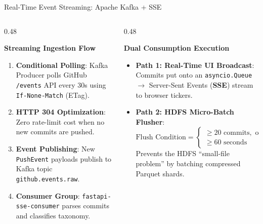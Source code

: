 \documentclass[aspectratio=169, 10pt]{beamer}
\begin{document}
\begin{frame}{Real-Time Event Streaming: Apache Kafka + SSE}
  \begin{columns}[T]
    \begin{column}{0.48\textwidth}
      \begin{block}{\textbf{Streaming Ingestion Flow}}
        \begin{enumerate}
          \item \textbf{Conditional Polling}: Kafka Producer polls GitHub \texttt{/events} API every 30s using \texttt{If-None-Match} (ETag).
          \item \textbf{HTTP 304 Optimization}: Zero rate-limit cost when no new commits are pushed.
          \item \textbf{Event Publishing}: New \texttt{PushEvent} payloads publish to Kafka topic \texttt{github.events.raw}.
          \item \textbf{Consumer Group}: \texttt{fastapi-sse-consumer} parses commits and classifies taxonomy.
        \end{enumerate}
      \end{block}
    \end{column}
    
    \begin{column}{0.48\textwidth}
      \begin{block}{\textbf{Dual Consumption Execution}}
        \begin{itemize}
          \item \textbf{Path 1: Real-Time UI Broadcast}: Commits put onto an \texttt{asyncio.Queue} $\to$ Server-Sent Events (\textbf{SSE}) stream to browser tickers.
          \item \textbf{Path 2: HDFS Micro-Batch Flusher}:
            \begin{equation*}
              \text{Flush Condition} = \begin{cases}
                \ge 20 \text{ commits}, \text{ or} \\
                \ge 60 \text{ seconds}
              \end{cases}
            \end{equation*}
            Prevents the HDFS ``small-file problem'' by batching compressed Parquet shards.
        \end{itemize}
      \end{block}
    \end{column}
  \end{columns}
\end{frame}
\end{document}
